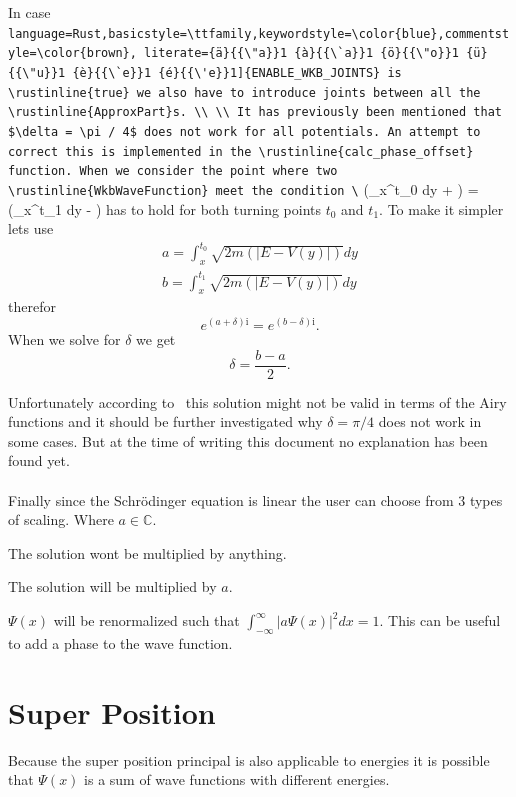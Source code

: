 \documentclass[11pt,DIV=10,final]{scrreprt} %
\providecommand{\rustinline}{\lstinline[language=Rust,basicstyle=\ttfamily,keywordstyle=\color{blue},commentstyle=\color{brown}, literate={ä}{{\"a}}1 {à}{{\`a}}1 {ö}{{\"o}}1 {ü}{{\"u}}1 {è}{{\`e}}1 {é}{{\'e}}1]} % für Inline-C++ Code
\newcommand{\mi}{{\text{i}}}
\begin{document}
In case \rustinline{ENABLE_WKB_JOINTS} is \rustinline{true} we also have to introduce joints between all the \rustinline{ApproxPart}s.
\\
\\
It has previously been mentioned that $\delta = \pi / 4$ does not work for all potentials. An attempt to correct this is implemented in the \rustinline{calc_phase_offset} function.
When we consider the point where two \rustinline{WkbWaveFunction} meet the condition
\[
  \exp\left(\mi \int_{x}^{t_{0}} dy + \mi \delta\right) =
  \exp\left(\mi \int_{x}^{t_{1}} dy - \mi \delta\right)
\]
has to hold for both turning points $t_{0}$ and $t_{1}$.
To make it simpler lets use
\begin{align}
a = \int_{x}^{t_{0}}\sqrt{2m(|E - V(y)|)} dy \\
b = \int_{x}^{t_{1}}\sqrt{2m(|E - V(y)|)} dy
\end{align}
therefor
\[
  e^{(a + \delta) \mi} = e^{(b - \delta)\mi}.
\]
When we solve for $\delta$ we get
\[
  \delta = \frac{b - a}{2}.
\]

Unfortunately according to~\cite{hall2013quantum} this solution might not be valid in terms
of the Airy functions and it should be further investigated why $\delta = \pi / 4$ does not
work in some cases. But at the time of writing this document no explanation has been found
yet.
\\
\\
Finally since the Schrödinger equation is linear the user can choose from 3 types of scaling.
Where $a \in \mathbb{C}$.
\begin{description}\label{sec:scaling-types}
    \item[None] The solution wont be multiplied by anything.
    \item[Mul(a)] The solution will be multiplied by $a$.
  \item[Renormalize(a)] $\Psi(x)$ will be renormalized such that
        $
            \int_{-\infty}^{\infty} |a \Psi(x)|^{2} dx = 1
        $. This can be useful to add a phase to the wave function.
\end{description}

\section{Super Position}
Because the super position principal is also applicable to energies it is possible that
$\Psi(x)$ is a sum of wave functions with different energies.
\end{document}
